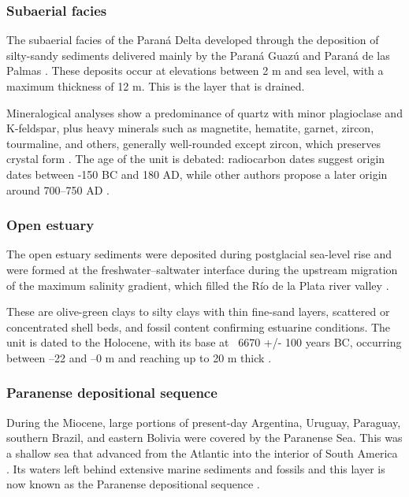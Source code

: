\subsubsection{Subaerial facies}
The subaerial facies of the Paraná Delta developed through the deposition of silty-sandy sediments delivered mainly by the Paraná Guazú and Paraná de las Palmas \autocite{joseluiscavallottoEvolucionCambiosAmbientales2005}. These deposits occur at elevations between 2 m and sea level, with a maximum thickness of 12 m. This is the layer that is drained.

Mineralogical analyses show a predominance of quartz with minor plagioclase and K-feldspar, plus heavy minerals such as magnetite, hematite, garnet, zircon, tourmaline, and others, generally well-rounded except zircon, which preserves crystal form \autocite{rafaelcordiniContribucionConocimientoGeologia1949}. The age of the unit is debated: radiocarbon dates suggest origin dates between -150 BC and 180 AD, while other authors propose a later origin around 700–750 AD \autocite{joseluiscavallottoEvolucionCambiosAmbientales2005}.

\subsubsection{Open estuary}
The open estuary sediments were deposited during postglacial sea-level rise and were formed at the freshwater–saltwater interface during the upstream migration of the maximum salinity gradient, which filled the Río de la Plata river valley \autocite{joseluiscavallottoEvolucionCambiosAmbientales2005}.

These are olive-green clays to silty clays with thin fine-sand layers, scattered or concentrated shell beds, and fossil content confirming estuarine conditions. The unit is dated to the Holocene, with its base at ~6670 +/- 100 years BC, occurring between –22 and –0 m and reaching up to 20 m thick \autocite{vogelGroningenRadiocarbonDates1969}.

\subsubsection{Paranense depositional sequence}
During the Miocene, large portions of present-day Argentina, Uruguay, Paraguay, southern Brazil, and eastern Bolivia were covered by the Paranense Sea. This was a shallow sea that advanced from the Atlantic into the interior of South America . Its waters left behind extensive marine sediments and fossils and this layer is now known as the Paranense depositional sequence \autocite{tineoReconstructingSouthAmerican2024}.

